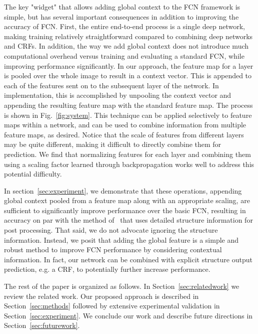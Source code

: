\documentclass{article} \usepackage{iclr2016_conference}
\begin{document}
The key "widget" that allows adding global context to the FCN framework is simple, but has several important consequences in addition to improving the accuracy of FCN. First, the entire end-to-end process is a single deep network, making training relatively straightforward compared to combining deep networks and CRFs. In addition, the way we add global context does not introduce much computational overhead versus training and evaluating a standard FCN, while improving performance significantly. In our approach, the feature map for a layer is pooled over the whole image to result in a context vector. This is appended to each of the features sent on to the subsequent layer of the network. In implementation, this is accomplished by unpooling the context vector and appending the resulting feature map with the standard feature map. The process is shown in Fig.~\ref{fig:system}. This technique can be applied selectively to feature maps within a network, and can be used to combine information from multiple feature maps, as desired. Notice that the scale of features from different layers may be quite different, making it difficult to directly combine them for prediction. We find that  normalizing features for each layer and combining them using a scaling factor learned through backpropagation works well to address this potential difficulty. 

In section~\ref{sec:experiment}, we demonstrate that these operations, appending global context pooled from a feature map along with an appropriate scaling, are sufficient to significantly improve performance over the basic FCN, resulting in accuracy on par with the method of~\cite{chen2014semantic} that uses detailed structure information for post processing. That said, we do not advocate ignoring the structure information. Instead, we posit that adding the global feature is a simple and robust method to improve FCN performance by considering contextual information. In fact, our network can be combined with explicit structure output prediction, e.g. a CRF, to potentially further increase performance.

The rest of the paper is organized as follows. In Section~\ref{sec:relatedwork} we review the related work. Our proposed approach is described in Section~\ref{sec:methods} followed by extensive experimental validation in Section~\ref{sec:experiment}. We conclude our work and describe future directions in Section~\ref{sec:futurework}.
\end{document}
